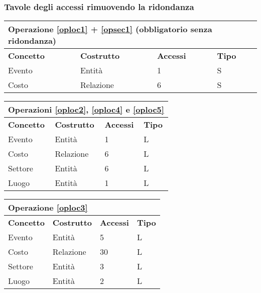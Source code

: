 \documentclass[a4paper,11pt]{article}
\begin{document}
\subsubsection*{Tavole degli accessi rimuovendo la ridondanza}

\begin{tabularx}{\textwidth}{|X|X|X|X|}
\hline
  \multicolumn{4}{|l|}{\textbf{Operazione \ref{oploc1} + \ref{opsec1} (obbligatorio senza ridondanza)}} \\
\hline
\textbf{Concetto} & \textbf{Costrutto} & \textbf{Accessi} & \textbf{Tipo}\\
\hline
Evento & Entità & 1 & S \\
\hline
Costo & Relazione & 6 & S \\
\hline
\end{tabularx}
\newline
\vspace*{1em}
\newline
\begin{tabularx}{\textwidth}{|X|X|X|X|}
\hline
  \multicolumn{4}{|l|}{\textbf{Operazioni \ref{oploc2}, \ref{oploc4} e \ref{oploc5}}} \\
\hline
\textbf{Concetto} & \textbf{Costrutto} & \textbf{Accessi} & \textbf{Tipo}\\
\hline
Evento & Entità & 1 & L \\
\hline
Costo & Relazione & 6 & L \\
\hline
Settore & Entità & 6 & L \\
\hline
Luogo & Entità & 1 & L \\
\hline
\end{tabularx}
\newline
\vspace*{1em}
\newline
\begin{tabularx}{\textwidth}{|X|X|X|X|}
\hline
  \multicolumn{4}{|l|}{\textbf{Operazione \ref{oploc3}}} \\
\hline
\textbf{Concetto} & \textbf{Costrutto} & \textbf{Accessi} & \textbf{Tipo}\\
\hline
Evento & Entità & 5 & L \\
\hline
Costo & Relazione & 30 & L \\
\hline
Settore & Entità & 3 & L \\
\hline
Luogo & Entità & 2 & L \\
\hline
\end{tabularx}
\newline
\vspace*{1em}
\end{document}
